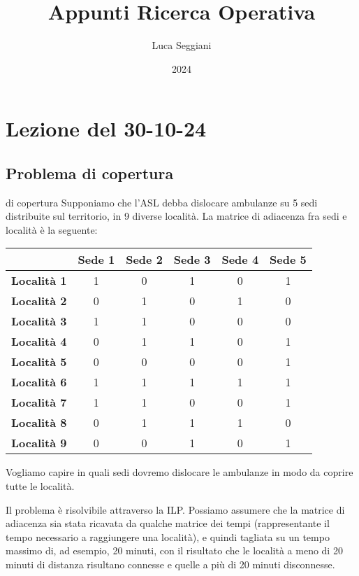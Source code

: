 \documentclass[a4paper,11pt]{article}
\title{Appunti Ricerca Operativa}
\author{Luca Seggiani}
\date{2024}
\begin{document}
\section{Lezione del 30-10-24}

\thispagestyle{empty}
\pagestyle{fancy}

\subsection{Problema di copertura}
\begin{problem}{di copertura}
	Supponiamo che l'ASL debba dislocare ambulanze su 5 sedi distribuite sul territorio, in 9 diverse località.
	La matrice di adiacenza fra sedi e località è la seguente:

	\center {}
	\begin{tabular} { | c | c | c | c | c | c | }
		\hline
		& \bfseries Sede 1 & \bfseries Sede 2 & \bfseries Sede 3 & \bfseries Sede 4 & \bfseries Sede 5\\
		\hline 
		\bfseries Località 1 & 1 & 0 & 1 & 0 & 1 \\
		\bfseries Località 2 & 0 & 1 & 0 & 1 & 0 \\
		\bfseries Località 3 & 1 & 1 & 0 & 0 & 0 \\
		\bfseries Località 4 & 0 & 1 & 1 & 0 & 1 \\
		\bfseries Località 5 & 0 & 0 & 0 & 0 & 1 \\
		\bfseries Località 6 & 1 & 1 & 1 & 1 & 1 \\
		\bfseries Località 7 & 1 & 1 & 0 & 0 & 1 \\
		\bfseries Località 8 & 0 & 1 & 1 & 1 & 0 \\
		\bfseries Località 9 & 0 & 0 & 1 & 0 & 1 \\
		\hline
	\end{tabular}	
	\par\bigskip
	\raggedright
	Vogliamo capire in quali sedi dovremo dislocare le ambulanze in modo da coprire tutte le località.
\end{problem}
Il problema è risolvibile attraverso la ILP.
Possiamo assumere che la matrice di adiacenza sia stata ricavata da qualche matrice dei tempi (rappresentante il tempo necessario a raggiungere una località), e quindi tagliata su un tempo massimo di, ad esempio, 20 minuti, con il risultato che le località a meno di 20 minuti di distanza risultano connesse e quelle a più di 20 minuti disconnesse.
\end{document}
